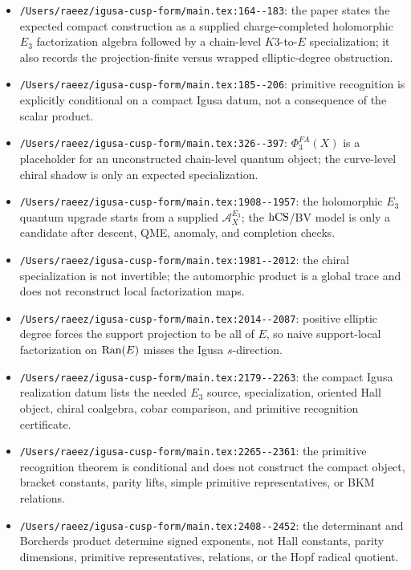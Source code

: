 \begin{itemize}
\item \verb|/Users/raeez/igusa-cusp-form/main.tex:164--183|:
the paper states the expected compact construction as a supplied
charge-completed holomorphic \(E_3\) factorization algebra followed by a
chain-level \(K3\)-to-\(E\) specialization; it also records the
projection-finite versus wrapped elliptic-degree obstruction.

\item \verb|/Users/raeez/igusa-cusp-form/main.tex:185--206|:
primitive recognition is explicitly conditional on a compact Igusa
datum, not a consequence of the scalar product.

\item \verb|/Users/raeez/igusa-cusp-form/main.tex:326--397|:
\(\Phi^{FA}_3(X)\) is a placeholder for an unconstructed chain-level
quantum object; the curve-level chiral shadow is only an expected
specialization.

\item \verb|/Users/raeez/igusa-cusp-form/main.tex:1908--1957|:
the holomorphic \(E_3\) quantum upgrade starts from a supplied
\(\mathcal A_X^{E_3}\); the \(\mathrm{hCS}\)/BV model is only a candidate after
descent, QME, anomaly, and completion checks.

\item \verb|/Users/raeez/igusa-cusp-form/main.tex:1981--2012|:
the chiral specialization is not invertible; the automorphic product is
a global trace and does not reconstruct local factorization maps.

\item \verb|/Users/raeez/igusa-cusp-form/main.tex:2014--2087|:
positive elliptic degree forces the support projection to be all of
\(E\), so naive support-local factorization on \(\mathrm{Ran}(E)\) misses the
Igusa \(s\)-direction.

\item \verb|/Users/raeez/igusa-cusp-form/main.tex:2179--2263|:
the compact Igusa realization datum lists the needed \(E_3\) source,
specialization, oriented Hall object, chiral coalgebra, cobar
comparison, and primitive recognition certificate.

\item \verb|/Users/raeez/igusa-cusp-form/main.tex:2265--2361|:
the primitive recognition theorem is conditional and does not construct
the compact object, bracket constants, parity lifts, simple primitive
representatives, or BKM relations.

\item \verb|/Users/raeez/igusa-cusp-form/main.tex:2408--2452|:
the determinant and Borcherds product determine signed exponents, not
Hall constants, parity dimensions, primitive representatives, relations,
or the Hopf radical quotient.


\end{itemize}
